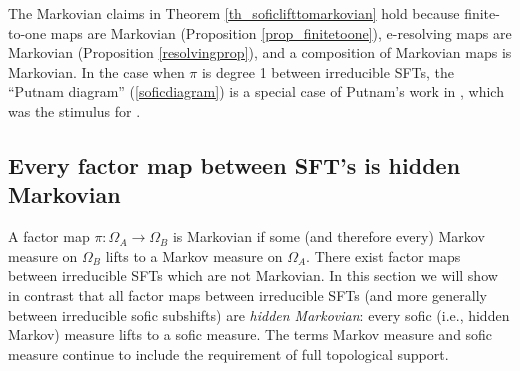 \documentclass{kepart2010}
\theoremstyle{plain}
\theoremstyle{definition}
\theoremstyle{remark}
\theoremstyle{definition}
\numberwithin{equation}{section}
\begin{document}
The Markovian claims in Theorem \ref{th_soficlifttomarkovian} hold
because finite-to-one maps are Markovian (Proposition
\ref{prop_finitetoone}), e-resolving maps are Markovian (Proposition
\ref{resolvingprop}), and a composition of Markovian maps is
Markovian. In the case
when $\pi$ is degree 1 between irreducible SFTs, the ``Putnam
diagram'' (\ref{soficdiagram})
 is a special case of Putnam's work
 in \cite{Putnam2005}, which was the stimulus for
\cite{Boyle2005}.

\subsection{Every factor map between SFT's is hidden
Markovian}\label{sec_factorhiddenmarkovian}

A factor map $\pi: \Omega_A \to \Omega_B$ is   Markovian if some
(and therefore every) Markov measure on $\Omega_B$ lifts to a Markov
measure on $\Omega_A$. There exist factor maps between irreducible
SFTs which are not Markovian. In this section we will show in
contrast that all factor maps between irreducible SFTs (and more
generally  between irreducible sofic subshifts) are {\em hidden
Markovian}: every sofic (i.e., hidden Markov) measure lifts to a
sofic measure. The terms Markov measure and sofic measure continue
to include the requirement of full topological support.
\end{document}
